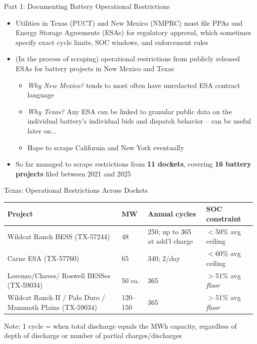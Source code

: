 \documentclass[aspectratio=169]{beamer}
\begin{document}
\begin{frame}{Part 1: Documenting Battery Operational Restrictions}
\begin{itemize}
    \item Utilities in Texas (PUCT) and New Mexico (NMPRC) must file PPAs and Energy Storage Agreements (ESAs) for regulatory approval, which sometimes specify exact cycle limits, SOC windows, and enforcement rules
    \item (In the process of scraping) operational restrictions from publicly released ESAs for battery projects in New Mexico and Texas
    \begin{itemize}
        \item \textit{Why New Mexico?} tends to most often have unredacted ESA contract language
        \item \textit{Why Texas?} Any ESA can be linked to granular public data on the individual battery's individual bids and dispatch behavior -- can be useful later on...
        \item Hope to scrape California and New York eventually
    \end{itemize}
    \item So far managed to scrape restrictions from \textbf{11 dockets}, covering \textbf{16 battery projects} filed between 2021 and 2025
\end{itemize}
\end{frame}

\begin{frame}{Texas: Operational Restrictions Across Dockets}
\footnotesize
\begin{tabular}{p{5cm} p{1.4cm} p{3.0cm} p{3.5cm}}
\toprule
\textbf{Project} & \textbf{MW} & \textbf{Annual cycles} & \textbf{SOC constraint} \\
\midrule
Wildcat Ranch BESS (TX-57244) & 48 & 250; up to 365 at add'l charge & $<$50\% avg ceiling \\
\addlinespace
Carne ESA (TX-57760) & 65 & 340; 2/day & $<$60\% avg ceiling \\
\addlinespace
Lorenzo/Chaves/ Roswell BESSes (TX-59034) & 50 ea. & 365 & $>$51\% avg \textit{floor}\\
\addlinespace
Wildcat Ranch II / Palo Duro / Mammoth Plains (TX-59034) & 120--150 & 365 & $>$51\% avg \textit{floor} \\
\bottomrule
\end{tabular}

\vspace{0.3cm}
Note: 1 cycle = when total discharge equals the MWh capacity, regardless of depth of discharge or number of partial charges/discharges


\end{frame}
\end{document}
